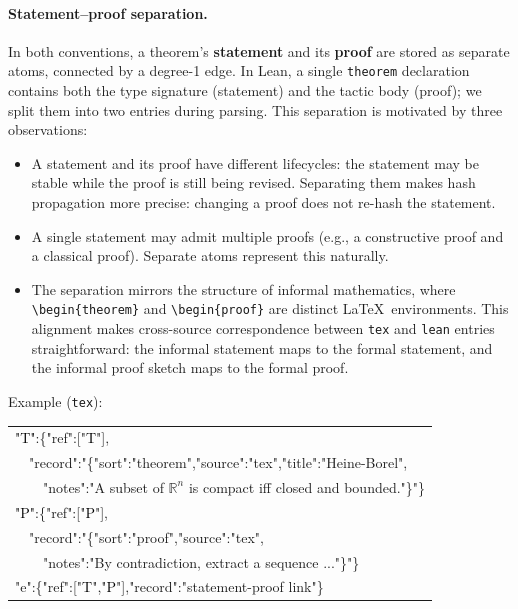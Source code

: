 \paragraph{Statement--proof separation.}
In both conventions, a theorem's \textbf{statement} and its \textbf{proof} are stored as separate atoms, connected by a degree-1 edge. In Lean, a single \texttt{theorem} declaration contains both the type signature (statement) and the tactic body (proof); we split them into two entries during parsing. This separation is motivated by three observations:
\begin{itemize}
  \item A statement and its proof have different lifecycles: the statement may be stable while the proof is still being revised. Separating them makes hash propagation more precise: changing a proof does not re-hash the statement.
  \item A single statement may admit multiple proofs (e.g., a constructive proof and a classical proof). Separate atoms represent this naturally.
  \item The separation mirrors the structure of informal mathematics, where \verb|\begin{theorem}| and \verb|\begin{proof}| are distinct \LaTeX\ environments. This alignment makes cross-source correspondence between \texttt{tex} and \texttt{lean} entries straightforward: the informal statement maps to the formal statement, and the informal proof sketch maps to the formal proof.
\end{itemize}

\noindent Example (\texttt{tex}):

\medskip
{\scriptsize\ttfamily
\begin{tabular}{@{}l@{}}
\textcolor{black}{"T"}:\{"ref":["\textcolor{black}{T}"],\\
\ \ "record":"\{"sort":"theorem","source":"tex","title":"Heine-Borel",\\
\ \ \ \ "notes":"A subset of $\mathbb{R}^n$ is compact iff closed and bounded."\}"\}\\[3pt]
\textcolor{black}{"P"}:\{"ref":["\textcolor{black}{P}"],\\
\ \ "record":"\{"sort":"proof","source":"tex",\\
\ \ \ \ "notes":"By contradiction, extract a sequence ..."\}"\}\\[3pt]
\textcolor{blue!70!black}{"e"}:\{"ref":["\textcolor{black}{T}","\textcolor{black}{P}"],"record":"statement-proof link"\}
\end{tabular}
}
\medskip

